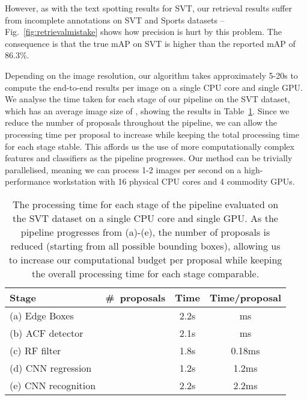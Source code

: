 \documentclass[twocolumn]{svjour3}          \smartqed  \usepackage{epsfig}
\begin{document}
However, as with the text spotting results for SVT, our retrieval results suffer from incomplete annotations on SVT and Sports datasets -- Fig.~\ref{fig:retrievalmistake} shows how precision is hurt by this problem. The consequence is that the true mAP on SVT is higher than the reported mAP of 86.3\%. 

Depending on the image resolution, our algorithm takes approximately 5-20s to compute the end-to-end results per image on a single CPU core and single GPU. We analyse the time taken for each stage of our pipeline on the SVT dataset, which has an average image size of , showing the results in Table~\ref{table:timings}. Since we reduce the number of proposals throughout the pipeline, we can allow the processing time per proposal to increase while keeping the total processing time for each stage stable. This affords us the use of more computationally complex features and classifiers as the pipeline progresses. Our method can be trivially parallelised, meaning we can process 1-2 images per second on a high-performance workstation with 16 physical CPU cores and 4 commodity GPUs. 





\begin{table}
\begin{center}
\footnotesize
\begin{tabular}{|l|c|c|c|} \hline
Stage & \#~proposals & Time & Time/proposal\\
\hline\hline
(a) Edge Boxes &  & 2.2s & ms\\
(b) ACF detector &  & 2.1s & ms\\
(c) RF filter &  & 1.8s & 0.18ms\\
(d) CNN regression &  & 1.2s & 1.2ms\\
(e) CNN recognition &  & 2.2s & 2.2ms\\
\hline
\end{tabular}
\caption{The processing time for each stage of the pipeline evaluated on the SVT dataset on a single CPU core and single GPU. As the pipeline progresses from (a)-(e), the number of proposals is reduced (starting from all possible bounding boxes), allowing us to increase our computational budget per proposal while keeping the overall processing time for each stage comparable.}
\label{table:timings}
\end{center}
\end{table}
\end{document}
